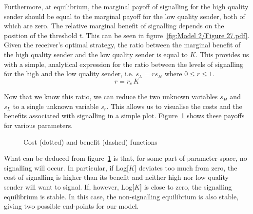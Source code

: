 \documentclass[a4paper,12pt]{article}
\numberwithin{equation}{section}
\begin{document}
Furthermore, at equilibrium, the marginal payoff of signalling for the high quality sender should be equal to the marginal payoff for the low quality sender, both of which are zero. The relative marginal benefit of signalling depends on the position of the threshold $t$. This can be seen in figure~\ref{fig:Model 2/Figure 27.pdf}. Given the receiver's optimal strategy, the ratio between the marginal benefit of the high quality sender and the low quality sender is equal to $K$. This provides us with a simple, analytical expression for the ratio between the levels of signalling for the high and the low quality sender, i.e. $s_{L}=r s_{H}$ where $0 \leq r \leq 1$.
\begin{equation}
\label{eq:SignalDetectionModel/Ratio}
r=r_{c} \, K
\end{equation}

Now that we know this ratio, we can reduce the two unknown variables $s_{H}$ and $s_{L}$ to a single unknown variable $s_{r}$. This allows us to visualise the costs and the benefits associated with signalling in a simple plot. Figure~\ref{fig:Model 2/Figure 202122} shows these payoffs for various parameters.
\begin{figure}[!h]
\begin{center}
\hspace{1mm}
\hspace{1mm}
\caption{Cost (dotted) and benefit (dashed) functions}
\label{fig:Model 2/Figure 202122}
\end{center}
\end{figure}

What can be deduced from figure~\ref{fig:Model 2/Figure 202122} is that, for some part of parameter-space, no signalling will occur. In particular, if Log[$K$] deviates too much from zero, the cost of signalling is higher than its benefit and neither high nor low quality sender will want to signal. If, however, Log[$K$] is close to zero, the signalling equilibrium is stable. In this case, the non-signalling equilibrium is also stable, giving two possible end-points for our model.
\end{document}
